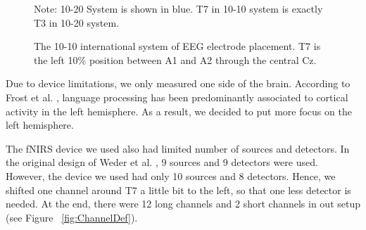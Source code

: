 \begin{figure}[H]
  \centering
  \caption{The 10-10 international system of EEG electrode placement. T7 is the left 10\% position between A1 and A2 through the central Cz.}
  \label{fig:tenten}
  \medskip
  \footnotesize {Note: 10-20 System is shown in blue. T7 in 10-10 system is exactly T3 in 10-20 system.}

\end{figure}


Due to device limitations, we only measured one side of the brain. According to Frost et al. \citeyearpar {Frost1999-vs} , language processing has been predominantly associated to cortical activity in the left hemisphere. As a result, we decided to put more focus on the left hemisphere.

The fNIRS device we used also had limited number of sources and detectors. In the original design of Weder et al. \citeyearpar{Weder2018}, 9 sources and 9 detectors were used. However, the device we used had only 10 sources and 8 detectors. Hence, we shifted one channel around T7 a little bit to the left, so that one less detector is needed. At the end, there were 12 long channels and 2 short channels in out setup (see Figure ~\ref{fig:ChannelDef}).

